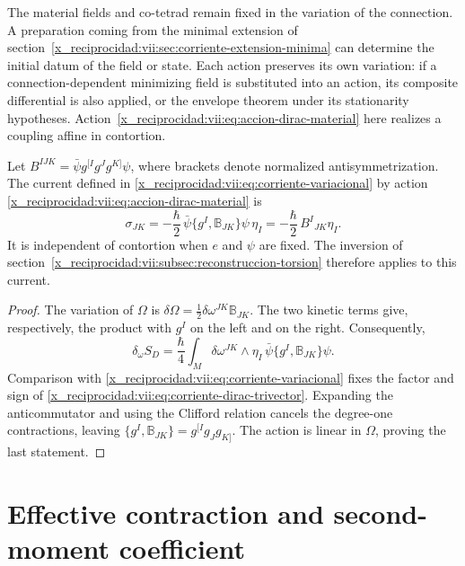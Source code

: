 The material fields and co-tetrad remain fixed in the variation
of the connection. A preparation coming from the minimal extension of
section~\ref{x_reciprocidad:vii:sec:corriente-extension-minima} can determine
the initial datum of the field or state. Each action preserves its
own variation: if a connection-dependent minimizing field
is substituted into an action, its composite differential is also applied,
or the envelope theorem under its stationarity hypotheses.
Action~\eqref{x_reciprocidad:vii:eq:accion-dirac-material} here realizes a
coupling affine in contortion.

\begin{proposition}
\label{x_reciprocidad:vii:prop:corriente-dirac-explicita}
Let
\(B^{IJK}=\bar\psi g^{[I}g^Jg^{K]}\psi\), where brackets
denote normalized antisymmetrization. The current defined in
\eqref{x_reciprocidad:vii:eq:corriente-variacional} by action
\eqref{x_reciprocidad:vii:eq:accion-dirac-material} is
\begin{equation}
 \sigma_{JK}
 =-\frac{\hbar}{2}\,
   \bar\psi\{g^I,\mathbb B_{JK}\}\psi\,\eta_I
 =-\frac{\hbar}{2}\,B^I{}_{JK}\eta_I.
 \label{x_reciprocidad:vii:eq:corriente-dirac-trivector}
\end{equation}
It is independent of contortion when \(e\) and \(\psi\) are
fixed. The inversion of section~\ref{x_reciprocidad:vii:subsec:reconstruccion-torsion}
therefore applies to this current.
\end{proposition}
\begin{proof}
The variation of \(\Omega\) is
\(\delta\Omega=\frac12\delta\omega^{JK}\mathbb B_{JK}\).
The two kinetic terms give, respectively, the product with
\(g^I\) on the left and on the right. Consequently,
\[
 \delta_\omega S_D
 =\frac{\hbar}{4}\int_M\delta\omega^{JK}\wedge\eta_I\,
                 \bar\psi\{g^I,\mathbb B_{JK}\}\psi.
\]
Comparison with \eqref{x_reciprocidad:vii:eq:corriente-variacional} fixes the
factor and sign of \eqref{x_reciprocidad:vii:eq:corriente-dirac-trivector}.
Expanding the anticommutator and using the Clifford relation
cancels the degree-one contractions, leaving
\(\{g^I,\mathbb B_{JK}\}=g^{[I}g_Jg_{K]}\).
The action is linear in \(\Omega\), proving the last
statement.
\end{proof}

\section{Effective contraction and second-moment coefficient}
\label{x_reciprocidad:vii:subsec:contraccion-espinorial}

